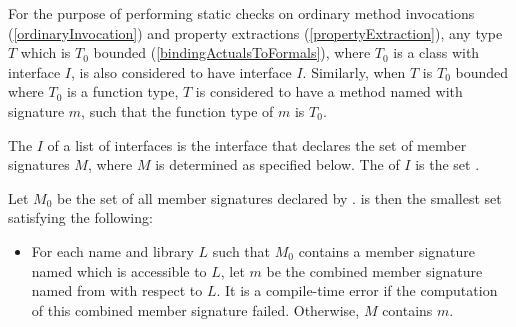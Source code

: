 \documentclass[makeidx]{article}
\begin{document}

\LMHash{}%
For the purpose of performing static checks on ordinary method invocations
(\ref{ordinaryInvocation})
and property extractions
(\ref{propertyExtraction}),
any type $T$ which is $T_0$ bounded
(\ref{bindingActualsToFormals}),
where $T_0$ is a class with interface $I$,
is also considered to have interface $I$.
Similarly, when $T$ is $T_0$ bounded where $T_0$ is a function type,
$T$ is considered to have a method named \CALL{} with signature $m$,
such that the function type of $m$ is $T_0$.

\LMHash{}%
%
The  $I$ of a list of interfaces 
is the interface that declares the set of member signatures $M$,
where $M$ is determined as specified below.
The  of $I$ is the set .

\LMHash{}%
Let $M_0$ be the set of all member signatures declared by .
 is then the smallest set satisfying the following:

\begin{itemize}
\item For each name \id{} and library $L$ such that $M_0$ contains
  a member signature named \id{} which is accessible to $L$,
  let $m$ be the combined member signature named \id{}
  from  with respect to $L$.
  It is a compile-time error
  if the computation of this combined member signature failed.
  Otherwise, $M$ contains $m$.
\end{itemize}

\end{document}
